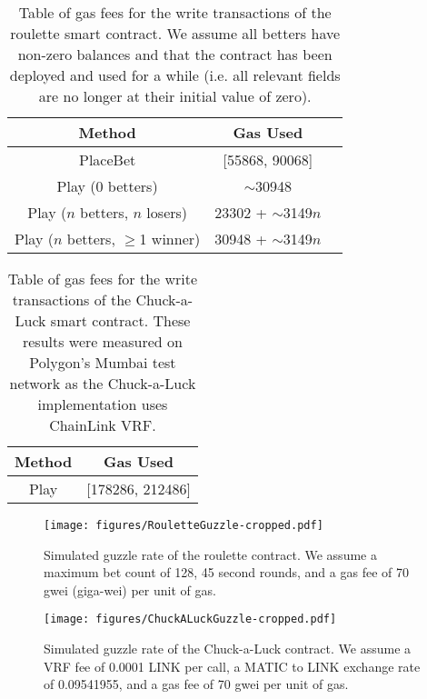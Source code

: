 \documentclass[10pt,journal,compsoc]{IEEEtran}
\begin{document}
\begin{table}[!h]
    \centering
    \caption{Table of gas fees for the write transactions of the roulette smart contract. We assume all betters have non-zero balances and that the contract has been deployed and used for a while (i.e. all relevant fields are no longer at their initial value of zero).}
    \label{tab:roulettegasfees}
    \begin{tabular}{c | c c}
        \hline\hline
        Method & Gas Used \\ 
        \hline
        PlaceBet & [55868, 90068] \\
        Play (0 betters) & $\sim$30948 \\
        Play ($n$ betters, $n$ losers) & 23302 + $\sim$3149$n$ \\
        Play ($n$ betters, $\geq$1 winner) & 30948 + $\sim$3149$n$ \\
        \hline\hline
    \end{tabular}
\end{table}

\begin{table}[!h]
    \centering
    \caption{Table of gas fees for the write transactions of the Chuck-a-Luck smart contract. These results were measured on Polygon's Mumbai test network as the Chuck-a-Luck implementation uses ChainLink VRF.}
    \label{tab:dicegasfees}
    \begin{tabular}{c | c}
        \hline\hline
        Method & Gas Used \\ 
        \hline
        Play &  [178286, 212486] \\
        \hline\hline
    \end{tabular}
\end{table}

\begin{figure}[!h]
    \centering
    \texttt{[image: figures/RouletteGuzzle-cropped.pdf]}
    \caption{Simulated guzzle rate of the roulette contract. We assume a maximum bet count of 128, 45 second rounds, and a gas fee of 70 gwei (giga-wei) per unit of gas.}
    \label{fig:playguzzle}
\end{figure}

\begin{figure}[!h]
    \centering
    \texttt{[image: figures/ChuckALuckGuzzle-cropped.pdf]}
    \caption{Simulated guzzle rate of the Chuck-a-Luck contract. We assume a VRF fee of 0.0001 LINK per call, a MATIC to LINK exchange rate of 0.09541955, and a gas fee of 70 gwei per unit of gas.}
    \label{fig:chuckguzzle}
\end{figure}
\end{document}

